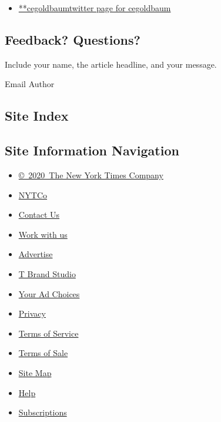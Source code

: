 \begin{itemize}
\tightlist
\item
  \href{https://twitter.com/cegoldbaum}{**cegoldbaumtwitter page for
  cegoldbaum}
\end{itemize}

\hypertarget{feedback-questions}{%
\subsection{Feedback? Questions?}\label{feedback-questions}}

Include your name, the article headline, and your message.

Email Author

\hypertarget{site-index}{%
\subsection{Site Index}\label{site-index}}

\hypertarget{site-information-navigation}{%
\subsection{Site Information
Navigation}\label{site-information-navigation}}

\begin{itemize}
\tightlist
\item
  \href{https://help.nytimes3xbfgragh.onion/hc/en-us/articles/115014792127-Copyright-notice}{©~2020~The
  New York Times Company}
\end{itemize}

\begin{itemize}
\tightlist
\item
  \href{https://www.nytco.com/}{NYTCo}
\item
  \href{https://help.nytimes3xbfgragh.onion/hc/en-us/articles/115015385887-Contact-Us}{Contact
  Us}
\item
  \href{https://www.nytco.com/careers/}{Work with us}
\item
  \href{https://nytmediakit.com/}{Advertise}
\item
  \href{http://www.tbrandstudio.com/}{T Brand Studio}
\item
  \href{https://www.nytimes3xbfgragh.onion/privacy/cookie-policy\#how-do-i-manage-trackers}{Your
  Ad Choices}
\item
  \href{https://www.nytimes3xbfgragh.onion/privacy}{Privacy}
\item
  \href{https://help.nytimes3xbfgragh.onion/hc/en-us/articles/115014893428-Terms-of-service}{Terms
  of Service}
\item
  \href{https://help.nytimes3xbfgragh.onion/hc/en-us/articles/115014893968-Terms-of-sale}{Terms
  of Sale}
\item
  \href{https://spiderbites.nytimes3xbfgragh.onion}{Site Map}
\item
  \href{https://help.nytimes3xbfgragh.onion/hc/en-us}{Help}
\item
  \href{https://www.nytimes3xbfgragh.onion/subscription?campaignId=37WXW}{Subscriptions}
\end{itemize}

